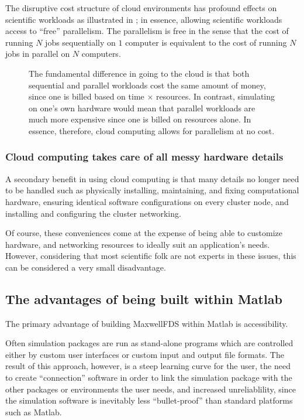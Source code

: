 \documentclass{article}
\newcommand{\MaxwellFDS}{MaxwellFDS }
\begin{document}
The disruptive cost structure of cloud environments 
    has profound effects on scientific workloads 
    as illustrated in ;
    in essence, allowing scientific workloads access
    to ``free'' parallelism.
The parallelism is free in the sense that 
    the cost of running $N$ jobs sequentially on $1$ computer is equivalent to 
    the cost of running $N$ jobs in parallel on $N$ computers.

\begin{figure}[ht]\begin{center}

\caption{The fundamental difference in going to the cloud
            is that both sequential and parallel workloads
            cost the same amount of money,
            since one is billed based on time $\times$ resources.
        In contrast, simulating on one's own hardware would 
            mean that parallel workloads are much more expensive
            since one is billed on resources alone.
        In essence, therefore, cloud computing allows for 
            parallelism at no cost.}
\label{fig:cloud vs traditional}
\end{center} \end{figure}

\subsubsection{Cloud computing takes care of all messy hardware details}
A secondary benefit in using cloud computing 
    is that many details no longer need to be handled such as
    \BI physically installing, maintaining, and fixing computational hardware,
    \I  ensuring identical software configurations on every cluster node, and 
    \I  installing and configuring the cluster networking. \EI

Of course, these conveniences come at the expense of 
    being able to customize hardware, and networking resources
    to ideally suit an application's needs.
However, considering that most scientific folk
    are not experts in these issues,
    this can be considered a very small disadvantage.

\subsection{The advantages of being built within Matlab}
The primary advantage of building \MaxwellFDS within Matlab is accessibility.

Often simulation packages are run as stand-alone programs
    which are controlled either by custom user interfaces
    or custom input and output file formats.
The result of this approach, however, is 
    \BI a steep learning curve for the user,
    \I  the need to create ``connection'' software
            in order to link the simulation package with
            the other packages or environments the user needs, and  
    \I  increased unreliablility, since the simulation software
            is inevitably less ``bullet-proof'' than standard
            platforms such as Matlab. \EI
    
\end{document}
